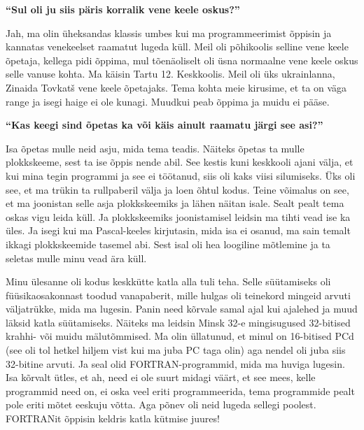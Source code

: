 \textbf{\enquote{Sul oli ju siis päris korralik vene keele oskus?}}

Jah, ma olin üheksandas klassis umbes kui ma programmeerimist õppisin ja
kannatas venekeelset raamatut lugeda küll. Meil oli põhikoolis selline vene
keele õpetaja, kellega pidi õppima, mul tõenäoliselt oli üsna normaalne vene
keele oskus selle vanuse kohta. Ma käisin Tartu 12.
Keskkoolis. Meil oli üks ukrainlanna, Zinaida
Tovkatš vene keele õpetajaks. Tema kohta meie kirusime, et ta on väga range ja
isegi haige ei ole kunagi. Muudkui peab õppima ja muidu ei pääse.

\textbf{\enquote{Kas keegi sind õpetas ka või käis ainult raamatu järgi see
asi?}}

Isa õpetas mulle neid asju, mida tema teadis. Näiteks õpetas ta mulle
plokkskeeme, sest ta ise õppis nende abil. See kestis kuni keskkooli ajani
välja, et kui mina tegin programmi ja see ei töötanud, siis oli kaks viisi
silumiseks. Üks oli see, et ma trükin ta rullpaberil välja ja loen õhtul kodus.
Teine võimalus on see, et ma joonistan selle asja plokkskeemiks ja lähen näitan
isale. Sealt pealt tema oskas vigu leida küll. Ja plokkskeemiks joonistamisel
leidsin ma tihti vead ise ka üles. Ja isegi kui ma Pascal-keeles kirjutasin,
mida isa ei osanud, ma sain temalt ikkagi plokkskeemide tasemel abi. Sest isal
oli hea loogiline mõtlemine ja ta seletas mulle minu vead ära küll.

Minu ülesanne oli kodus keskkütte katla alla tuli teha. Selle süütamiseks oli
füüsikaosakonnast toodud vanapaberit, mille hulgas oli teinekord mingeid arvuti
väljatrükke, mida ma lugesin. Panin need kõrvale samal ajal kui ajalehed ja
muud läksid katla süütamiseks. Näiteks ma leidsin Minsk
32-e mingisugused 32-bitised krahhi- või
muidu mälutõmmised. Ma olin üllatunud, et minul on 16-bitised PCd (see oli tol
hetkel hiljem vist kui ma juba PC taga olin) aga nendel oli juba siis 32-bitine
arvuti. Ja seal olid FORTRAN-programmid, mida ma huviga lugesin. Isa kõrvalt
ütles, et ah, need ei ole suurt midagi väärt, et see mees, kelle programmid
need on, ei oska veel eriti programmeerida, tema programmide pealt pole eriti
mõtet eeskuju võtta. Aga põnev oli neid lugeda sellegi poolest. FORTRANit
õppisin keldris katla kütmise juures!

